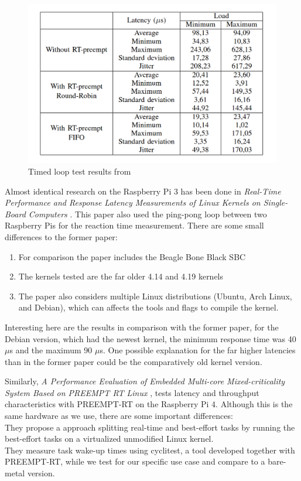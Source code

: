\begin{figure}
  \begin{center}
    \includegraphics[width=.8\textwidth]{assets/Rasp3.png}
    \caption{Timed loop test results from \cite{Rasp3}}
    \label{fig:rasp3}
  \end{center}
\end{figure}

Almost identical research on the Raspberry Pi 3 has been done in \textit{Real-Time Performance and Response Latency Measurements of Linux Kernels on Single-Board Computers} \cite{computers10050064}.
This paper also used the ping-pong loop between two Raspberry Pis for the reaction time measurement.
There are some small differences to the former paper:
\begin{enumerate}
  \item For comparison the paper includes the Beagle Bone Black SBC
  \item The kernels tested are the far older 4.14 and 4.19 kernels
  \item The paper also considers multiple Linux distributions (Ubuntu, Arch Linux, and Debian), which can affects the tools and flags to compile the kernel.
\end{enumerate}
Interesting here are the results in comparison with the former paper, for the Debian version, which had the newest kernel, the minimum response time was 40$\mu$s and the maximum 90 $\mu$s.
One possible explanation for the far higher latencies than in the former paper could be the comparatively old kernel version.

Similarly, \textit{A Performance Evaluation of Embedded Multi-core Mixed-criticality System Based on PREEMPT RT Linux} \cite{Rasp4},
tests latency and throughput characteristics with PREEMPT-RT on the Raspberry Pi 4.
Although this is the same hardware as we use, there are some important differences:\\
They propose a approach splitting real-time and best-effort tasks by running the best-effort tasks on a virtualized unmodified Linux kernel.\\
They measure task wake-up times using cyclitest, a tool developed together with PREEMPT-RT, while we test for our specific use case and compare to a bare-metal version.\\

